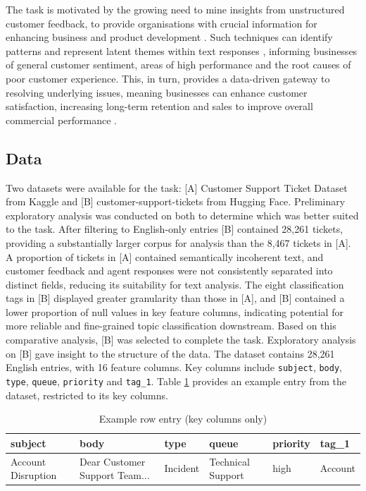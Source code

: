 \documentclass[11pt]{article}
\begin{document}
The task is motivated by the growing need to mine insights from unstructured customer feedback, to provide organisations with crucial information for enhancing business and product development \citep{gallagher_application_2019}. Such techniques can identify patterns and represent latent themes within text responses \citep{blei_latent_2003}, informing businesses of general customer sentiment, areas of high performance and the root causes of poor customer experience. This, in turn, provides a data-driven gateway to resolving underlying issues, meaning businesses can enhance customer satisfaction, increasing long-term retention and sales to improve overall commercial performance \citep{gallagher_application_2019}.\subsection{Data}
Two datasets were available for the task: [A] Customer Support Ticket Dataset from Kaggle and [B] customer-support-tickets from Hugging Face. Preliminary exploratory analysis was conducted on both to determine which was better suited to the task. After filtering to English-only entries [B] contained 28,261 tickets, providing a substantially larger corpus for analysis than the 8,467 tickets in [A]. A proportion of tickets in [A] contained semantically incoherent text, and customer feedback and agent responses were not consistently separated into distinct fields, reducing its suitability for text analysis. The eight classification tags in [B] displayed greater granularity than those in [A], and [B] contained a lower proportion of null values in key feature columns, indicating potential for more reliable and fine-grained topic classification downstream. Based on this comparative analysis, [B]  was selected to complete the task.
Exploratory analysis on [B] gave insight to the structure of the data. The dataset contains 28,261 English entries, with 16 feature columns. Key columns include \texttt{subject}, \texttt{body}, \texttt{type}, \texttt{queue}, \texttt{priority} and \texttt{tag\_1}. Table \ref{tab:example} provides an example entry from the dataset, restricted to its key columns.
\begin{table}[h]
\centering
\caption{Example row entry (key columns only)}
\label{tab:example}
\begin{tabular}{p{3cm}p{2.5cm}p{2cm}p{3cm}p{1.5cm}p{1.2cm}}
\hline
\textbf{subject} & \textbf{body} & \textbf{type} & \textbf{queue} & \textbf{priority} & \textbf{tag\_1} \\
\hline
Account Disruption & Dear Customer            Support Team...& Incident & Technical Support & high & Account \\
\hline
\end{tabular}
\end{table}
\end{document}
